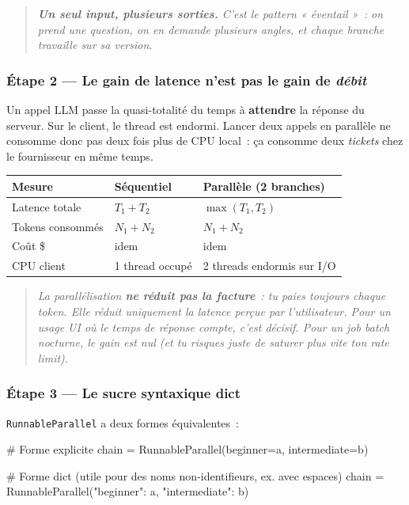 \documentclass[11pt,a4paper]{article}
\begin{document}
\begin{quote}\itshape
\textbf{Un seul input, plusieurs sorties.} C'est le pattern « éventail »~:
on prend une question, on en demande plusieurs angles, et chaque branche
travaille sur sa version.
\end{quote}

\subsubsection*{Étape 2 — Le gain de latence n'est pas le gain de \emph{débit}}

Un appel LLM passe la quasi-totalité du temps à \textbf{attendre} la
réponse du serveur. Sur le client, le thread est endormi. Lancer deux
appels en parallèle ne consomme donc pas deux fois plus de CPU local~: ça
consomme deux \emph{tickets} chez le fournisseur en même temps.

\begin{center}
\begin{tabular}{lll}
\toprule
\textbf{Mesure} & \textbf{Séquentiel} & \textbf{Parallèle (2 branches)} \\
\midrule
Latence totale & $T_1 + T_2$        & $\max(T_1, T_2)$ \\
Tokens consommés & $N_1 + N_2$      & $N_1 + N_2$ \\
Coût \$         & idem               & idem \\
CPU client      & 1 thread occupé   & 2 threads endormis sur I/O \\
\bottomrule
\end{tabular}
\end{center}

\begin{quote}\itshape
La parallélisation \textbf{ne réduit pas la facture}~: tu paies toujours
chaque token. Elle réduit uniquement la \emph{latence perçue} par
l'utilisateur. Pour un usage UI où le temps de réponse compte, c'est
décisif. Pour un job batch nocturne, le gain est nul (et tu risques
juste de saturer plus vite ton \emph{rate limit}).
\end{quote}

\subsubsection*{Étape 3 — Le sucre syntaxique dict}

\texttt{RunnableParallel} a deux formes équivalentes~:

\begin{pythoncode}
# Forme explicite
chain = RunnableParallel(beginner=a, intermediate=b)

# Forme dict (utile pour des noms non-identifieurs, ex. avec espaces)
chain = RunnableParallel({"beginner": a, "intermediate": b})
\end{pythoncode}
\end{document}
